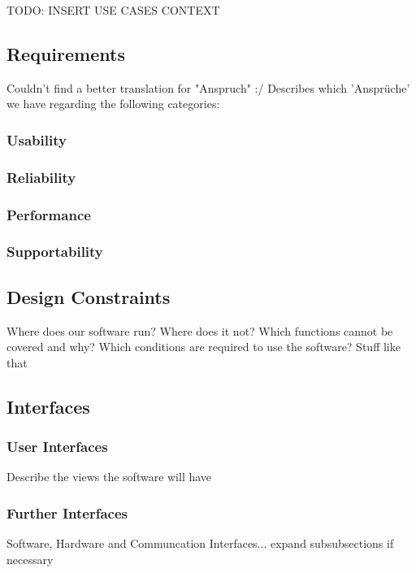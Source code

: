 TODO: INSERT USE CASES CONTEXT

\subsection{Requirements}
\label{sec:domainBc}
Couldn't find a better translation for "Anspruch" :/
Describes which 'Ansprüche' we have regarding the following categories:
\subsubsection{Usability}
\label{sec:domainBca}
\subsubsection{Reliability}
\label{sec:domainBcb}
\subsubsection{Performance}
\label{sec:domainBcc}
\subsubsection{Supportability}
\label{sec:domainBcd}

\subsection{Design Constraints}
\label{sec:domainBd}
Where does our software run? Where does it not? Which functions cannot be covered and why? Which conditions are required to use the software? Stuff like that

\subsection{Interfaces}
\label{sec:domainBe}
\subsubsection{User Interfaces}
\label{sec:domainBea}
Describe the views the software will have
\subsubsection{Further Interfaces}
\label{sec:domainBeb}
Software, Hardware and Communcation Interfaces... expand subsubsections if necessary
